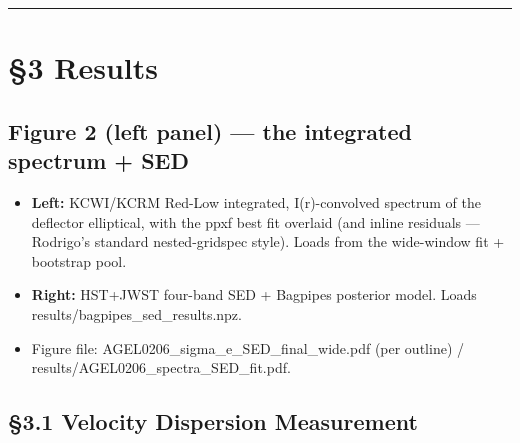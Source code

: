 \documentclass[
]{article}
\providecommand{\tightlist}{%
  \setlength{\itemsep}{0pt}\setlength{\parskip}{0pt}}
\newcommand{\BreakablePath}[1]{{\ttfamily\sloppy #1}}
\begin{document}
\begin{center}\rule{0.5\linewidth}{0.5pt}\end{center}

\hypertarget{results}{%
\section{§3 Results}\label{results}}

\hypertarget{figure-2-left-panel-the-integrated-spectrum-sed}{%
\subsection{Figure 2 (left panel) --- the integrated spectrum +
SED}\label{figure-2-left-panel-the-integrated-spectrum-sed}}

\begin{itemize}
\tightlist
\item
  \textbf{Left:} KCWI/KCRM Red-Low integrated, I(r)-convolved spectrum
  of the deflector elliptical, with the ppxf best fit overlaid (and
  inline residuals --- Rodrigo's standard nested-gridspec style). Loads
  from the wide-window fit + bootstrap pool.
\item
  \textbf{Right:} HST+JWST four-band SED + Bagpipes posterior model.
  Loads
  \BreakablePath{results/\discretionary{}{}{}bagpipes\_\discretionary{}{}{}sed\_\discretionary{}{}{}results.\discretionary{}{}{}npz}.
\item
  Figure file:
  \BreakablePath{AGEL0206\_\discretionary{}{}{}sigma\_\discretionary{}{}{}e\_\discretionary{}{}{}SED\_\discretionary{}{}{}final\_\discretionary{}{}{}wide.\discretionary{}{}{}pdf}
  (per outline) /
  \BreakablePath{results/\discretionary{}{}{}AGEL0206\_\discretionary{}{}{}spectra\_\discretionary{}{}{}SED\_\discretionary{}{}{}fit.\discretionary{}{}{}pdf}.
\end{itemize}

\hypertarget{velocity-dispersion-measurement}{%
\subsection{§3.1 Velocity Dispersion
Measurement}\label{velocity-dispersion-measurement}}
\end{document}
